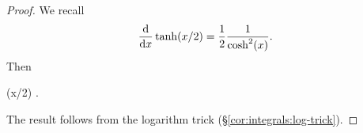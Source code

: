 \begin{proof}
  We recall
\begin{equation}
\frac{\mathrm{d}}{\mathrm{d} x}\tanh(x/2) = \frac{1}{2}\frac{1}{\cosh^{2}(x)}.
\end{equation}
  Then
\begin{calculation}
  \tanh(x/2)
  .
\end{calculation}
The result follows from the logarithm trick (\S\ref{cor:integrals:log-trick}).
\end{proof}

